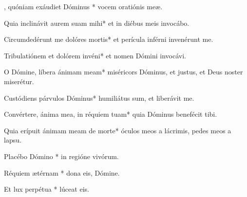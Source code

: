 \begin{psalmus}

, quóniam exáudiet Dóminus * vocem oratiónis meæ.

Quia inclinávit aurem suam mihi* et in diébus meis invocábo.

Circumdedérunt me dolóres mortis* et perícula inférni invenérunt me.

Tribulatiónem et dolórem invéni* et nomen Dómini invocávi.

O Dómine, líbera ánimam meam* miséricors Dóminus, et justus, et Deus noster miserétur.

Custódiens párvulos Dóminus* humiliátus sum, et liberávit me.

Convértere, ánima mea, in réquiem tuam* quia Dóminus benefécit tibi.

Quia erípuit ánimam meam de morte* óculos meos a lácrimis, pedes meos a lapsu.

Placébo Dómino * in regióne vivórum.

Réquiem ætérnam * dona eis, Dómine.

Et lux perpétua * lúceat eis.

\end{psalmus}
